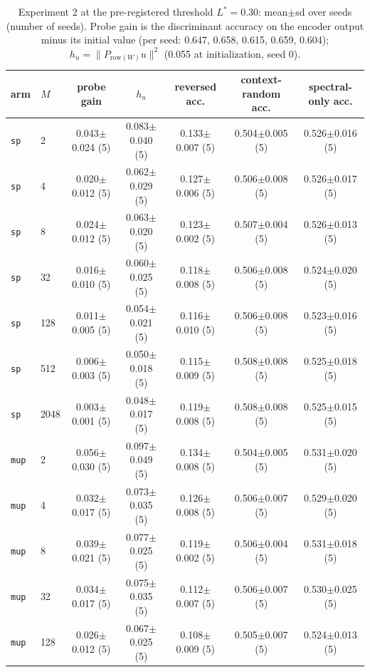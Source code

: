\begin{table}[htbp]\centering\scriptsize
\caption{Experiment 2 at the pre-registered threshold $L^\ast=0.30$: mean$\pm$sd over seeds (number of seeds). Probe gain is the discriminant accuracy on the encoder output minus its initial value (per seed: 0.647, 0.658, 0.615, 0.659, 0.604); $h_u=\|P_{\mathrm{row}(W)}u\|^2$ (0.055 at initialization, seed 0).}\label{tab:exp2_star}
\begin{tabular}{llccccc}\toprule
arm & $M$ & probe gain & $h_u$ & reversed acc. & context-random acc. & spectral-only acc. \\ \midrule
\texttt{sp} & 2 & 0.043$\pm$0.024 (5) & 0.083$\pm$0.040 (5) & 0.133$\pm$0.007 (5) & 0.504$\pm$0.005 (5) & 0.526$\pm$0.016 (5) \\
\texttt{sp} & 4 & 0.020$\pm$0.012 (5) & 0.062$\pm$0.029 (5) & 0.127$\pm$0.006 (5) & 0.506$\pm$0.008 (5) & 0.526$\pm$0.017 (5) \\
\texttt{sp} & 8 & 0.024$\pm$0.012 (5) & 0.063$\pm$0.020 (5) & 0.123$\pm$0.002 (5) & 0.507$\pm$0.004 (5) & 0.526$\pm$0.013 (5) \\
\texttt{sp} & 32 & 0.016$\pm$0.010 (5) & 0.060$\pm$0.025 (5) & 0.118$\pm$0.008 (5) & 0.506$\pm$0.008 (5) & 0.524$\pm$0.020 (5) \\
\texttt{sp} & 128 & 0.011$\pm$0.005 (5) & 0.054$\pm$0.021 (5) & 0.116$\pm$0.010 (5) & 0.506$\pm$0.008 (5) & 0.523$\pm$0.016 (5) \\
\texttt{sp} & 512 & 0.006$\pm$0.003 (5) & 0.050$\pm$0.018 (5) & 0.115$\pm$0.009 (5) & 0.508$\pm$0.008 (5) & 0.525$\pm$0.018 (5) \\
\texttt{sp} & 2048 & 0.003$\pm$0.001 (5) & 0.048$\pm$0.017 (5) & 0.119$\pm$0.008 (5) & 0.508$\pm$0.008 (5) & 0.525$\pm$0.015 (5) \\
\midrule
\texttt{mup} & 2 & 0.056$\pm$0.030 (5) & 0.097$\pm$0.049 (5) & 0.134$\pm$0.008 (5) & 0.504$\pm$0.005 (5) & 0.531$\pm$0.020 (5) \\
\texttt{mup} & 4 & 0.032$\pm$0.017 (5) & 0.073$\pm$0.035 (5) & 0.126$\pm$0.008 (5) & 0.506$\pm$0.007 (5) & 0.529$\pm$0.020 (5) \\
\texttt{mup} & 8 & 0.039$\pm$0.021 (5) & 0.077$\pm$0.025 (5) & 0.119$\pm$0.002 (5) & 0.506$\pm$0.004 (5) & 0.531$\pm$0.018 (5) \\
\texttt{mup} & 32 & 0.034$\pm$0.017 (5) & 0.075$\pm$0.035 (5) & 0.112$\pm$0.007 (5) & 0.506$\pm$0.007 (5) & 0.530$\pm$0.025 (5) \\
\texttt{mup} & 128 & 0.026$\pm$0.012 (5) & 0.067$\pm$0.025 (5) & 0.108$\pm$0.009 (5) & 0.505$\pm$0.007 (5) & 0.524$\pm$0.013 (5) \\

\end{tabular}
\end{table}

